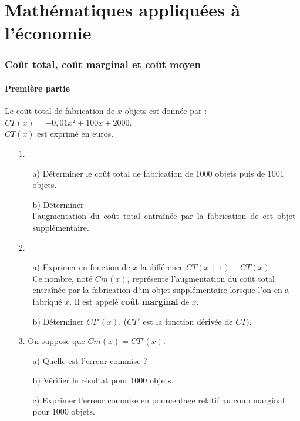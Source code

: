 \ifdefined\COMPLETE
\else
    
    \usepackage{variations}
    
\fi


\setcounter{section}{0} 

\part{Mathématiques appliquées à l'économie}

\section{Coût total, coût marginal et coût moyen}

\subsection{Première partie}

Le coût total de fabrication de $x$ objets est donnée par : $CT(x) = -0,01x^2 + 100x + 2000$. \\
$CT(x)$ est exprimé en euros. \\

\begin{itemize}
\item[1.] 
\begin{itemize}
\item[a)] Déterminer le coût total de fabrication de 1000 objets puis de 1001 objets. 
\item[b)] Déterminer \hbox{l'augmentation du coût total entraînée par la fabrication de cet objet supplémentaire.}
\end{itemize}
\item[2.]
\begin{itemize}
\item[a)] Exprimer en fonction de $x$ la différence $CT(x+1) - CT(x)$. \\ Ce nombre, noté $Cm(x)$, représente l'augmentation du coût total entraînée par la fabrication d'un objet supplémentaire lorsque l'on en a fabriqué $x$. Il est appelé \textbf{coût marginal} de $x$.
\item[b)] Déterminer $CT'(x)$. ($CT'$ est la fonction dérivée de $CT$). 
\end{itemize}
\item[3.] On suppose que $Cm(x) = CT'(x)$. 
\begin{itemize}
\item[a)] Quelle est l'erreur commise ?
\item[b)] Vérifier le résultat pour 1000 objets. 
\item[c)] Exprimer l'erreur commise en pourcentage relatif au coup marginal pour 1000 objets.
\end{itemize}
\end{itemize}

